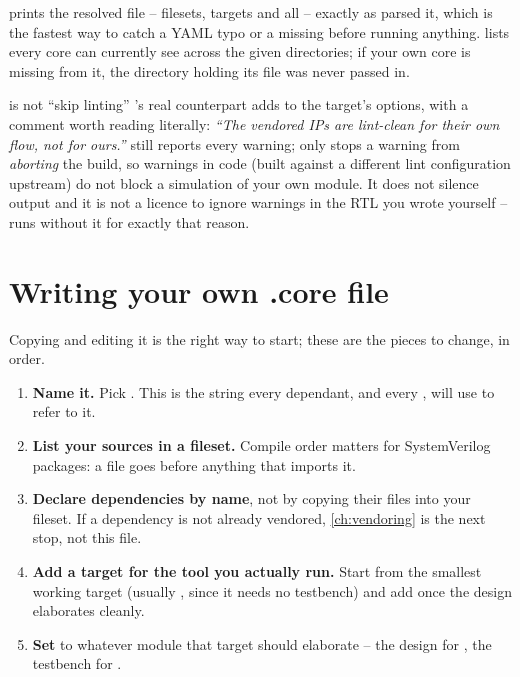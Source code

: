  prints the resolved  file -- filesets, targets
and all -- exactly as \FuseSoC parsed it, which is the fastest way to catch
a YAML typo or a missing  before running anything. 
lists every core \FuseSoC can currently see across the given
 directories; if your own core is missing from it, the
directory holding its  file was never passed in.

\begin{gotcha}{ is not ``skip linting''}
's real counterpart adds  to the
 target's  options, with a comment worth reading
literally: \emph{``The vendored IPs are lint-clean for their own flow, not
for ours.''}  still reports every warning; 
only stops a warning from \emph{aborting} the build, so warnings in
 code (built against a different lint configuration upstream)
do not block a simulation of your own module. It does not silence output
and it is not a licence to ignore warnings in the RTL you wrote yourself --
 runs without it for exactly that reason.
\end{gotcha}

\section{Writing your own .core file}

Copying  and editing it is the right way to start;
these are the pieces to change, in order.

\begin{enumerate}
  \item \textbf{Name it.} Pick .
        This is the string every dependant, and every ,
        will use to refer to it.
  \item \textbf{List your sources in a fileset.} Compile order matters for
        SystemVerilog packages: a  file goes before anything
        that imports it.
  \item \textbf{Declare dependencies by name}, not by copying their files
        into your fileset. If a dependency is not already vendored,
        \cref{ch:vendoring} is the next stop, not this file.
  \item \textbf{Add a target for the tool you actually run.} Start from the
        smallest working target (usually , since it needs no
        testbench) and add  once the design elaborates cleanly.
  \item \textbf{Set } to whatever module that target should
        elaborate -- the design for , the testbench for
        .
\end{enumerate}

